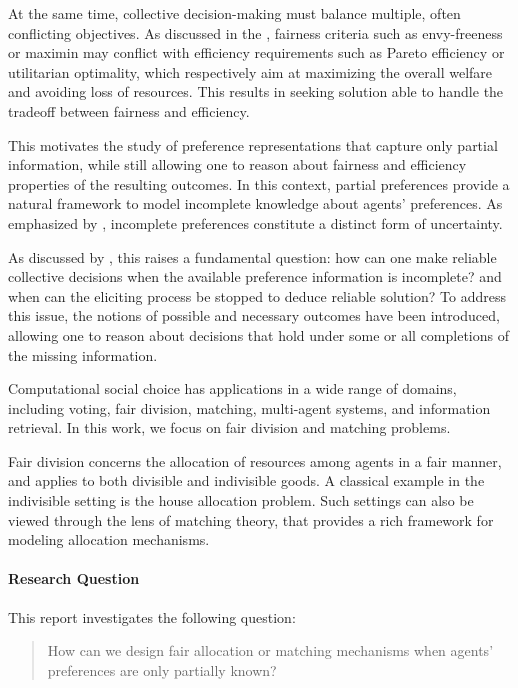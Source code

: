 \documentclass{article}
\begin{document}
At the same time, collective decision-making must balance multiple, often conflicting objectives. 
As discussed in the \citep[Chapter 12]{brandt2016handbook}, fairness criteria such as envy-freeness or maximin may conflict with efficiency requirements such as Pareto efficiency or utilitarian optimality, which respectively aim at maximizing the overall welfare and avoiding loss of resources. 
This results in seeking solution able to handle the tradeoff between fairness and efficiency.

This motivates the study of preference representations that capture only partial information, while still allowing one to reason about fairness and efficiency properties of the resulting outcomes.
In this context, partial preferences provide a natural framework to model incomplete knowledge about agents' preferences. 
As emphasized by \cite{kenig2019approximate}, incomplete preferences constitute a distinct form of uncertainty.

As discussed by \cite{lang2020collective}, this raises a fundamental question: how can one make reliable collective decisions when the available preference information is incomplete? and when can the eliciting process be stopped to deduce reliable solution?
To address this issue, the notions of possible and necessary outcomes have been introduced, allowing one to reason about decisions that hold under some or all completions of the missing information.

Computational social choice has applications in a wide range of domains, including voting, fair division, matching, multi-agent systems, and information retrieval. 
In this work, we focus on fair division and matching problems.

Fair division concerns the allocation of resources among agents in a fair manner, and applies to both divisible and indivisible goods. 
A classical example in the indivisible setting is the house allocation problem.
Such settings can also be viewed through the lens of matching theory, that provides a rich framework for modeling allocation mechanisms. 

\paragraph{Research Question}

This report investigates the following question:

\begin{quote}
How can we design fair allocation or matching mechanisms when agents' preferences are only partially known?
\end{quote}
\end{document}
